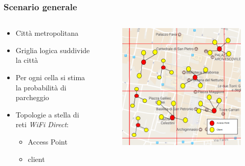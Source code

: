 \documentclass{beamer}
\begin{document}
\begin{frame}
  \frametitle{Scenario generale}
  \begin{columns}
    \begin{column}{0.6\textwidth}
      \begin{itemize}
	\item Città metropolitana
	\item Griglia logica suddivide la città
	\item Per ogni cella si stima la probabilità di parcheggio
	\item Topologie a stella di reti \textit{WiFi Direct}:
	\begin{itemize}
	  \item Access Point
	  \item client
	\end{itemize}
      \end{itemize}
    \end{column}

    \begin{column}{0.4\textwidth}
      \begin{figure}
	\raggedleft
	\includegraphics[width=\columnwidth]{img/arch_general.png}
      \end{figure}
    \end{column}
  \end{columns}
\end{frame}
\end{document}
